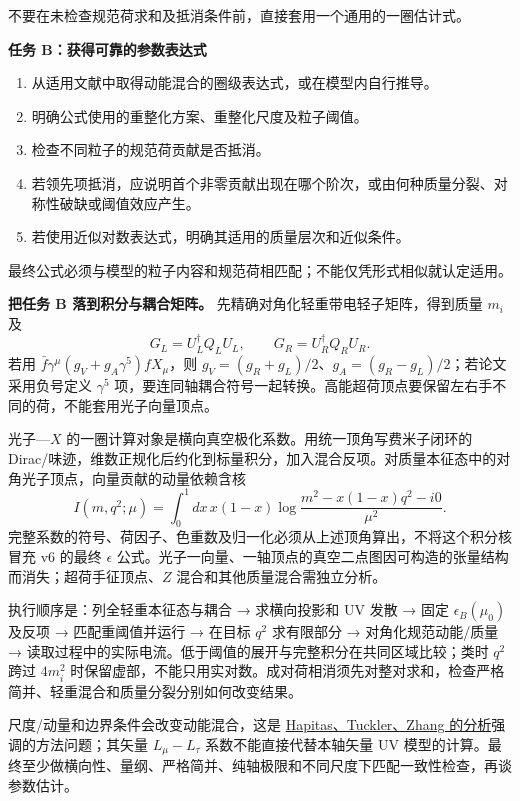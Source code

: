 \documentclass[
]{article}
\providecommand{\tightlist}{%
  \setlength{\itemsep}{0pt}\setlength{\parskip}{0pt}}
\begin{document}
不要在未检查规范荷求和及抵消条件前，直接套用一个通用的一圈估计式。

\textbf{任务 B：获得可靠的参数表达式}

\begin{enumerate}
\def\labelenumi{\arabic{enumi}.}
\tightlist
\item
  从适用文献中取得动能混合的圈级表达式，或在模型内自行推导。
\item
  明确公式使用的重整化方案、重整化尺度及粒子阈值。
\item
  检查不同粒子的规范荷贡献是否抵消。
\item
  若领先项抵消，应说明首个非零贡献出现在哪个阶次，或由何种质量分裂、对称性破缺或阈值效应产生。
\item
  若使用近似对数表达式，明确其适用的质量层次和近似条件。
\end{enumerate}

最终公式必须与模型的粒子内容和规范荷相匹配；不能仅凭形式相似就认定适用。

\textbf{把任务 B 落到积分与耦合矩阵。}
先精确对角化轻重带电轻子矩阵，得到质量 \(m_i\) 及 \[
G_L=U_L^\dagger Q_LU_L,\qquad G_R=U_R^\dagger Q_RU_R.
\] 若用 \(\bar f\gamma^\mu(g_V+g_A\gamma^5)fX_\mu\)，则
\(g_V=(g_R+g_L)/2\)、\(g_A=(g_R-g_L)/2\)；若论文采用负号定义
\(\gamma^5\)
项，要连同轴耦合符号一起转换。高能超荷顶点要保留左右手不同的荷，不能套用光子向量顶点。

光子---\(X\) 的一圈计算对象是横向真空极化系数。用统一顶角写费米子闭环的
Dirac/味迹，维数正规化后约化到标量积分，加入混合反项。对质量本征态中的对角光子顶点，向量贡献的动量依赖含核
\[
I(m,q^2;\mu)=\int_0^1dx\,x(1-x)
\log\frac{m^2-x(1-x)q^2-i0}{\mu^2}.
\]
完整系数的符号、荷因子、色重数及归一化必须从上述顶角算出，不将这个积分核冒充
v6 的最终 \(\epsilon\)
公式。光子一向量、一轴顶点的真空二点图因可构造的张量结构而消失；超荷手征顶点、\(Z\)
混合和其他质量混合需独立分析。

执行顺序是：列全轻重本征态与耦合 → 求横向投影和 UV 发散 → 固定
\(\epsilon_B(\mu_0)\) 及反项 → 匹配重阈值并运行 → 在目标 \(q^2\)
求有限部分 → 对角化规范动能/质量 →
读取过程中的实际电流。低于阈值的展开与完整积分在共同区域比较；类时
\(q^2\) 跨过 \(4m_i^2\)
时保留虚部，不能只用实对数。成对荷相消须先对整对求和，检查严格简并、轻重混合和质量分裂分别如何改变结果。

尺度/动量和边界条件会改变动能混合，这是
\href{https://arxiv.org/abs/2108.12440}{Hapitas、Tuckler、Zhang
的分析}强调的方法问题；其矢量 \(L_\mu-L_\tau\) 系数不能直接代替本轴矢量
UV
模型的计算。最终至少做横向性、量纲、严格简并、纯轴极限和不同尺度下匹配一致性检查，再谈参数估计。
\end{document}
